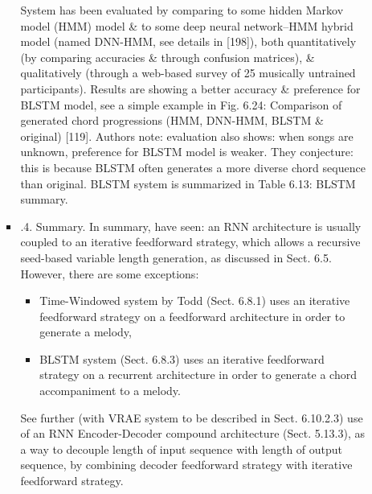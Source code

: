 \documentclass{article}
\begin{document}
\begin{itemize}
\begin{itemize}
\begin{itemize}
			System has been evaluated by comparing to some hidden Markov model (HMM) model \& to some deep neural network--HMM hybrid model (named DNN-HMM, see details in [198]), both quantitatively (by comparing accuracies \& through confusion matrices), \& qualitatively (through a web-based survey of 25 musically untrained participants). Results are showing a better accuracy \& preference for BLSTM model, see a simple example in {\sf Fig. 6.24: Comparison of generated chord progressions (HMM, DNN-HMM, BLSTM \& original) [119]}. Authors note: evaluation also shows: when songs are unknown, preference for BLSTM model is weaker. They conjecture: this is because BLSTM often generates a more diverse chord sequence than original. BLSTM system is summarized in {\sf Table 6.13: BLSTM summary}.
			\item {.4. Summary.} In summary, have seen: an RNN architecture is usually coupled to an iterative feedforward strategy, which allows a recursive seed-based variable length generation, as discussed in Sect. 6.5. However, there are some exceptions:
			\begin{itemize}
				\item Time-Windowed system by {\sc Todd} (Sect. 6.8.1) uses an iterative feedforward strategy on a feedforward architecture in order to generate a melody,
				\item BLSTM system (Sect. 6.8.3) uses an iterative feedforward strategy on a recurrent architecture in order to generate a chord accompaniment to a melody.
			\end{itemize}
			See further (with VRAE system to be described in Sect. 6.10.2.3) use of an RNN Encoder-Decoder compound architecture (Sect. 5.13.3), as a way to decouple length of input sequence with length of output sequence, by combining decoder feedforward strategy with iterative feedforward strategy.
			

\end{itemize}
\end{itemize}
\end{itemize}
\end{document}
